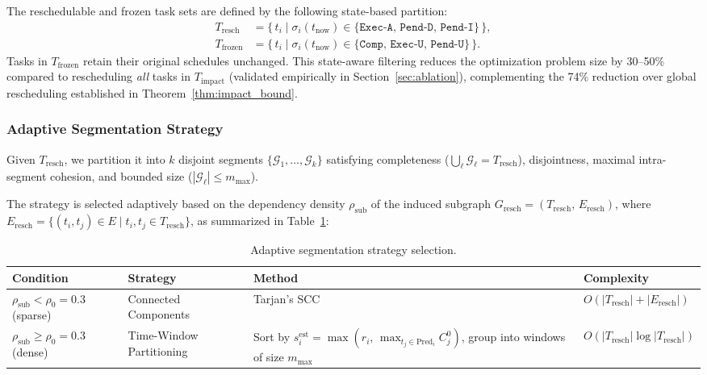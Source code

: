 \documentclass[manuscript,screen,review]{acmart}
\begin{document}
The reschedulable and frozen task sets are defined by the following state-based partition:
\begin{align}
T_{\mathrm{resch}} &= \bigl\{\, t_i \;\big|\;
    \sigma_i(t_{\mathrm{now}}) \in
    \{\texttt{Exec-A},\, \texttt{Pend-D},\, \texttt{Pend-I}\} \,\bigr\}, \\
T_{\mathrm{frozen}} &= \bigl\{\, t_i \;\big|\;
    \sigma_i(t_{\mathrm{now}}) \in
    \{\texttt{Comp},\, \texttt{Exec-U},\, \texttt{Pend-U}\} \,\bigr\}.
\end{align}
Tasks in $T_{\mathrm{frozen}}$ retain their original schedules unchanged.
This state-aware filtering reduces the optimization problem size by 30--50\% compared to rescheduling \emph{all} tasks in $T_{\mathrm{impact}}$ (validated empirically in Section~\ref{sec:ablation}),
complementing the 74\% reduction over global rescheduling established in Theorem~\ref{thm:impact_bound}.

\subsubsection{Adaptive Segmentation Strategy}

Given $T_{\mathrm{resch}}$, we partition it into $k$ disjoint segments
$\{\mathcal{G}_1, \ldots, \mathcal{G}_k\}$ satisfying completeness
($\bigcup_\ell \mathcal{G}_\ell = T_{\mathrm{resch}}$), disjointness, maximal
intra-segment cohesion, and bounded size ($|\mathcal{G}_\ell| \leq m_{\max}$).

The strategy is selected adaptively based on the dependency density
$\rho_{\mathrm{sub}}$ of the induced subgraph
$G_{\mathrm{resch}} = (T_{\mathrm{resch}},\, E_{\mathrm{resch}})$,
where $E_{\mathrm{resch}} = \{(t_i, t_j) \in E \mid t_i, t_j \in
T_{\mathrm{resch}}\}$, as summarized in Table~\ref{tab:segmentation}:

\begin{table}[h]
\centering
\caption{Adaptive segmentation strategy selection.}
\label{tab:segmentation}
\small
\begin{tabular}{@{}llll@{}}
\toprule
\textbf{Condition} & \textbf{Strategy} & \textbf{Method} & \textbf{Complexity} \\
\midrule
$\rho_{\mathrm{sub}} < \rho_0{=}0.3$ (sparse)
  & Connected Components
  & Tarjan's SCC~\cite{tarjan1972depth}
  & $O(|T_{\mathrm{resch}}| + |E_{\mathrm{resch}}|)$ \\
$\rho_{\mathrm{sub}} \geq \rho_0{=}0.3$ (dense)
  & Time-Window Partitioning
  & Sort by $s_i^{\mathrm{est}} = \max(r_i,\,
    \max_{t_j \in \mathrm{Pred}_i} C_j^0)$,
    group into windows of size $m_{\max}$
  & $O(|T_{\mathrm{resch}}| \log |T_{\mathrm{resch}}|)$ \\
\bottomrule
\end{tabular}
\end{table}
\end{document}
